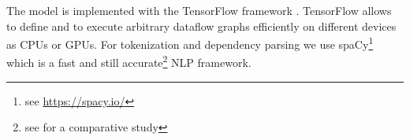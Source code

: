 The model is implemented with the TensorFlow framework  \autocite{abadi_tensorflow_2016}. TensorFlow allows to define and to execute arbitrary dataflow graphs efficiently on different devices as CPUs or GPUs. For tokenization and dependency parsing we use spaCy\footnote{see \url{https://spacy.io/}} which is a fast and still accurate\footnote{see \textcite{choi_it_2015} for a comparative study} \ac{NLP} framework. 






